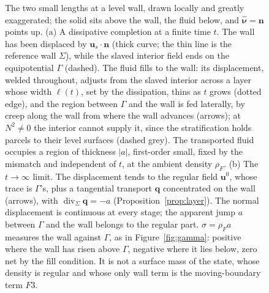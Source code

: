 \documentclass[11pt]{article}
\theoremstyle{definition}
\theoremstyle{remark}
\newcommand{\bu}{\mathbf{u}}
\newcommand{\bn}{\mathbf{n}}
\newcommand{\bq}{\mathbf{q}}
\newcommand{\divS}{\operatorname{div}_\Sigma}
\newcommand{\nuh}{\hat{\boldsymbol{\nu}}}
\begin{document}
\begin{figure}[htbp]
\caption{The two small lengths at a level wall, drawn locally and
greatly exaggerated; the solid sits above the wall, the fluid below,
and $\nuh = \bn$ points up. (a) A dissipative completion at a finite
time $t$. The wall has been displaced by $\bu_s\cdot\bn$ (thick curve;
the thin line is the reference wall $\Sigma$), while the slaved
interior field ends on the equipotential $\Gamma$ (dashed). The fluid
fills to the wall: its displacement, welded throughout, adjusts from
the slaved interior across a layer whose width $\ell(t)$, set by the
dissipation, thins as $t$ grows (dotted edge), and the region between
$\Gamma$ and the wall is fed laterally, by creep along the wall from
where the wall advances (arrows); at $N^2 \ne 0$ the interior cannot
supply it, since the stratification holds parcels to their level
surfaces (dashed grey). The transported fluid occupies a region of
thickness $|a|$, first-order small, fixed by the mismatch and
independent of $t$, at the ambient density $\rho_F$. (b) The $t \to
\infty$ limit. The displacement tends to the regular field $\bu^0$,
whose trace is $\Gamma$'s, plus a tangential transport $\bq$
concentrated on the wall (arrows), with $\divS\bq = -a$
(Proposition~\ref{prop:layer}). The normal displacement is continuous
at every stage; the apparent jump $a$ between $\Gamma$ and the wall
belongs to the regular part. $\sigma = \rho_F a$ measures the wall
against $\Gamma$, as in Figure~\ref{fig:gamma}: positive where the wall
has risen above $\Gamma$, negative where it lies below, zero net by the
fill condition. It is not a surface mass of the state, whose density is
regular and whose only wall term is the moving-boundary term $F3$.}
\label{fig:sheet}
\end{figure}
\end{document}
